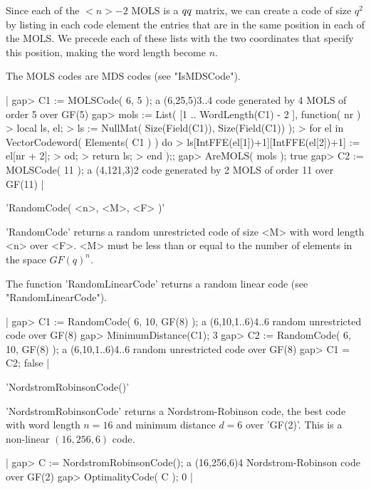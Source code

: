Since each of the $<n>-2$ MOLS  is a $q\*q$  matrix, we can create a code
of size $q^2$ by listing in each code element the entries that are in the
same position in  each of the MOLS.  We precede each  of these lists with
the two  coordinates that specify this  position,  making the word length
become $n$.

The MOLS codes are MDS codes (see "IsMDSCode").

|    gap> C1 := MOLSCode( 6, 5 );
    a (6,25,5)3..4 code generated by 4 MOLS of order 5 over GF(5)
    gap> mols := List( [1 .. WordLength(C1) - 2 ], function( nr )
    >       local ls, el;
    >       ls := NullMat( Size(Field(C1)), Size(Field(C1)) );
    >       for el in VectorCodeword( Elements( C1 ) ) do
    >          ls[IntFFE(el[1])+1][IntFFE(el[2])+1] := el[nr + 2];
    >       od;
    >       return ls;
    >    end );;
    gap> AreMOLS( mols );
    true
    gap> C2 := MOLSCode( 11 );
    a (4,121,3)2 code generated by 2 MOLS of order 11 over GF(11) |


'RandomCode( <n>, <M>, <F> )'

'RandomCode' returns  a random unrestricted  code of  size <M> with  word
length <n>  over <F>. <M> must  be less than  or equal  to the  number of
elements in the space $GF(q)^n$.

The   function  'RandomLinearCode' returns  a    random linear code  (see
"RandomLinearCode").

|    gap> C1 := RandomCode( 6, 10, GF(8) );
    a (6,10,1..6)4..6 random unrestricted code over GF(8)
    gap> MinimumDistance(C1);
    3
    gap> C2 := RandomCode( 6, 10, GF(8) );
    a (6,10,1..6)4..6 random unrestricted code over GF(8)
    gap> C1 = C2;
    false |


'NordstromRobinsonCode()'

'NordstromRobinsonCode' returns a  Nordstrom-Robinson code, the best code
with word length $n=16$ and minimum distance  $d=6$ over 'GF(2)'. This is
a non-linear $(16, 256, 6)$ code.

|    gap> C := NordstromRobinsonCode();
    a (16,256,6)4 Nordstrom-Robinson code over GF(2)
    gap> OptimalityCode( C );
    0 |


